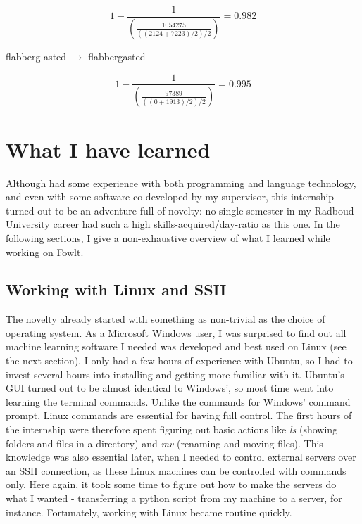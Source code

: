 \documentclass[12pt]{article}
\let\stdsection\section
\renewcommand\section{\newpage\stdsection}
\begin{document}
\[
1 - \frac{1}{(\frac{1054275}{((2124+7223)/2)/2})} = 0.982
\]

flabberg asted $\rightarrow$ flabbergasted

\[
1 - \frac{1}{(\frac{97389}{((0+1913)/2)/2})} = 0.995
\]


\section{What I have learned}
Although had some experience with both programming and language technology, and even with some software co-developed by my supervisor, this internship turned out to be an adventure full of novelty: no single semester in my Radboud University career had such a high skills-acquired/day-ratio as this one. In the following sections, I give a non-exhaustive overview of what I learned while working on Fowlt.

\subsection{Working with Linux and SSH}
The novelty already started with something as non-trivial as the choice of operating system. As a Microsoft Windows user, I was surprised to find out all machine learning software I needed was developed and best used on Linux (see the next section). I only had a few hours of experience with Ubuntu, so I had to invest several hours into installing and getting more familiar with it. Ubuntu's GUI turned out to be almost identical to Windows', so most time went into learning the terminal commands. Unlike the commands for Windows' command prompt, Linux commands are essential for having full control. The first hours of the internship were therefore spent figuring out basic actions like \emph{ls} (showing folders and files in a directory) and \emph{mv} (renaming and moving files). This knowledge was also essential later, when I needed to control external servers over an SSH connection, as these Linux machines can be controlled with commands only. Here again, it took some time to figure out how to make the servers do what I wanted - transferring a python script from my machine to a server, for instance. Fortunately, working with Linux became routine quickly.

\end{document}
